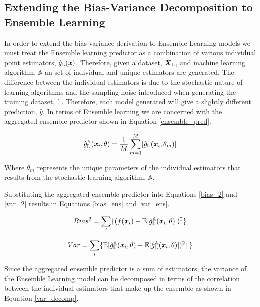\documentclass[../SMLreport_template.tex]{subfiles}
\begin{document}
\subsection{Extending the Bias-Variance Decomposition to Ensemble Learning}
In order to extend the bias-variance derivation to Ensemble Learning models we must treat the Ensemble learning predictor as a combination of various individual point estimators, \(\hat{g}_\mathbb{L}(\textbf{\textit{x}})\). Therefore, given a dataset, \(\textbf{\textit{X}}_\mathbb{L}\), and machine learning algorithm, \(\mathbb{A}\) an set of individual and unique estimators are generated. The difference between the individual estimators is due to the stochastic nature of learning algorithms and the sampling noise introduced when generating the training dataset, \(\mathbb{L}\). Therefore, each model generated will give a slightly different prediction, \(\hat{y}\). In terms of Ensemble learning we are concerned with the aggregated ensemble predictor shown in Equation \ref{ensemble_pred}.

\begin{equation}\label{ensemble_pred}
    \hat{g}_\mathbb{L}^\mathbb{A}(\textbf{\textit{x}}_i, \theta) = \frac{1}{M}\sum_{m=1}^{M}[\hat{g}_\mathbb{L}(\textbf{\textit{x}}_i, \theta_m)]
\end{equation}

Where \(\theta_m\) represents the unique parameters of the individual estimators that results from the stochastic learning algorithm, \(\mathbb{A}\).

Substituting the aggregated ensemble predictor into Equations \ref{bias_2} and \ref{var_2} results in Equations \ref{bias_ens} and \ref{var_ens}.

\begin{equation}\label{bias_ens}
    Bias^2 = \sum_{i}\{(f(\textbf{\textit{x}}_i)-\mathbb{E}[\hat{g}_\mathbb{L}^\mathbb{A}(\textbf{\textit{x}}_i, \theta)])^2\}
\end{equation}

\begin{equation}\label{var_ens}
    Var = \sum_{i}\{\mathbb{E}[\hat{g}_\mathbb{L}^\mathbb{A}(\textbf{\textit{x}}_i, \theta)-\mathbb{E}[\hat{g}_\mathbb{L}^\mathbb{A}(\textbf{\textit{x}}_i, \theta)])^2]]\}
\end{equation}

Since the aggregated ensemble predictor is a sum of estimators, the variance of the Ensemble Learning model can be decomposed in terms of the correlation between the individual estimators that make up the ensemble as shown in Equation \ref{var_decomp}.
\end{document}
